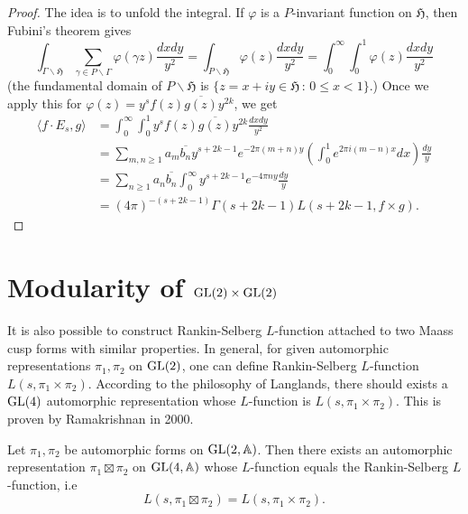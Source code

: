 \begin{proof}
The idea is to unfold the integral.
If $\varphi$ is a $P$-invariant function on $\mathfrak{H}$, then Fubini's theorem gives
$$
\int_{\Gamma\backslash \mathfrak{H}} \sum_{\gamma \in P \backslash \Gamma}\varphi(\gamma z) \frac{dxdy}{y^{2}}
=\int_{P \backslash \mathfrak{H}} \varphi(z) \frac{dxdy}{y^{2}}
= \int_{0}^{\infty} \int_{0}^{1} \varphi(z) \frac{dxdy}{y^{2}}
$$
(the fundamental domain of $P\backslash \mathfrak{H}$ is $\{z = x + iy \in \mathfrak{H}\,:\, 0\leq x < 1\}$.)
Once we apply this for $\varphi(z) = y^{s} f(z)\overline{g(z)}y^{2k}$, we get
\begin{align*}
    \langle f\cdot E_{s}, g\rangle &= \int_{0}^{\infty}\int_{0}^{1} y^{s}f(z)\overline{g(z)} y^{2k} \frac{dxdy}{y^{2}} \\
    &= \sum_{m, n \geq 1} a_{m} \overline{b_{n}}y^{s + 2k - 1} e^{-2\pi(m+n)y}  \left(\int_{0}^{1} e^{2\pi i (m - n)x}dx\right)\frac{dy}{y} \\
    &= \sum_{n\geq 1} a_{n}\overline{b_{n}} \int_{0}^{\infty} y^{s + 2k - 1} e^{-4\pi n y} \frac{dy}{y} \\
    &= (4\pi)^{-(s+2k-1)}\Gamma(s + 2k - 1) L(s+2k-1, f\times g).
\end{align*}
\end{proof}

\section{Modularity of $\operatorname{\mathrm{GL}}(2) \times \operatorname{\mathrm{GL}}(2)$}
It is also possible to construct Rankin-Selberg $L$-function attached to two Maass cusp forms with similar properties.
In general, for given automorphic representations $\pi_{1}, \pi_{2}$ on $\operatorname{\mathrm{GL}}(2)$,
one can define Rankin-Selberg $L$-function $L(s, \pi_{1}\times \pi_{2})$.
According to the philosophy of Langlands, there should exists a $\operatorname{\mathrm{GL}}(4)$ automorphic representation whose $L$-function 
is $L(s, \pi_{1}\times \pi_{2})$.
This is proven by Ramakrishnan in 2000.
\begin{theorem}
    \label{rankin-selberg-modularity}
    Let $\pi_{1}, \pi_{2}$ be automorphic forms on $\operatorname{\mathrm{GL}}(2, \mathbb{A})$.
    Then there exists an automorphic representation $\pi_{1} \boxtimes \pi_{2}$ on $\operatorname{\mathrm{GL}}(4, \mathbb{A})$
    whose $L$-function equals the Rankin-Selberg $L$-function, i.e 
    $$
        L(s, \pi_{1}\boxtimes \pi_{2}) = L(s, \pi_{1} \times \pi_{2}).
    $$
\end{theorem}

